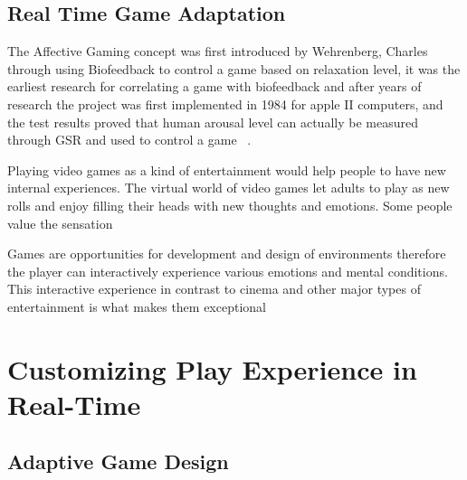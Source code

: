 \documentclass{uofsthesis-cs}
\begin{document}
\section{Real Time Game Adaptation}


The Affective Gaming concept was first introduced by Wehrenberg, Charles through using Biofeedback to control a game based on relaxation level, it was the earliest research for correlating a game with biofeedback and after years of research the project was first implemented in 1984 for apple II computers, and the test results proved that human arousal level can actually be measured through GSR and used to control a game  ~\cite{wehrenberg1995willball}.


Playing video games as a kind of entertainment would help people to have new internal
experiences. The virtual world of video games let adults to play as new rolls and enjoy filling
their heads with new thoughts and emotions. Some people value
the sensation

Games are opportunities for development and design of environments therefore
the player can interactively experience various emotions and mental conditions.
This interactive experience in contrast to cinema
and other major types of entertainment is what makes them exceptional



\chapter{Customizing Play Experience in Real-Time}
\label{chap:custmz}


\section{Adaptive Game Design}
\end{document}
